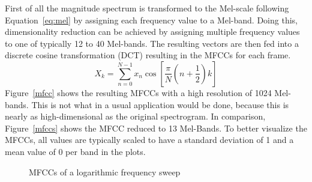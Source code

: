 \FloatBarrier
\noindent First of all the magnitude spectrum is transformed to the Mel-scale following Equation~\eqref{eq:mel} by assigning each frequency value to a Mel-band.
Doing this, dimensionality reduction can be achieved by assigning multiple frequency values to one of typically 12 to 40 Mel-bands. The resulting vectors are then fed into a discrete cosine transformation (DCT) resulting in the MFCCs for each frame. 
\begin{equation} \label{eq:dct}
X_k = \sum_{n=0}^{N-1}{x_n \cos\left[{\frac{\pi}{N}(n + \frac{1}{2})k}\right]}
\end{equation}
Figure~\ref{mfcc} shows the resulting MFCCs with a high resolution of 1024 Mel-bands. This is not what in a usual application would be done, because this is nearly as high-dimensional as the original spectrogram. In comparison, Figure~\ref{mfccs} shows the MFCC reduced to 13 Mel-Bands.
To better visualize the MFCCs, all values are typically scaled to have a standard deviation of 1 and a mean value of 0 per band in the plots. 
\begin{figure}[htbp]
	\centering
	\caption{MFCCs of a logarithmic frequency sweep}	
	\label{fig:mfcc}
\end{figure}

